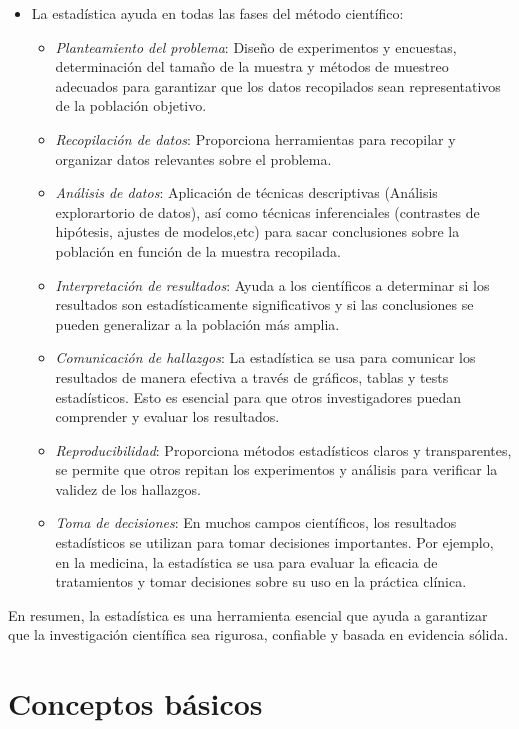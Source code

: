 \documentclass[
  spanish,
  letterpaper,
  DIV=11,
  numbers=noendperiod]{scrreprt}
\begin{document}
\begin{itemize}
\item
  La estadística ayuda en todas las fases del método científico:

  \begin{itemize}
  \item
    {\emph{Planteamiento del problema}}: Diseño de experimentos y
    encuestas, determinación del tamaño de la muestra y métodos de
    muestreo adecuados para garantizar que los datos recopilados sean
    representativos de la población objetivo.
  \item
    {\emph{Recopilación de datos}}: Proporciona herramientas para
    recopilar y organizar datos relevantes sobre el problema.
  \item
    {\emph{Análisis de datos}}: Aplicación de técnicas descriptivas
    (Análisis explorartorio de datos), así como técnicas inferenciales
    (contrastes de hipótesis, ajustes de modelos,etc) para sacar
    conclusiones sobre la población en función de la muestra recopilada.
  \item
    {\emph{Interpretación de resultados}}: Ayuda a los científicos a
    determinar si los resultados son estadísticamente significativos y
    si las conclusiones se pueden generalizar a la población más amplia.
  \item
    {\emph{Comunicación de hallazgos}}: La estadística se usa para
    comunicar los resultados de manera efectiva a través de gráficos,
    tablas y tests estadísticos. Esto es esencial para que otros
    investigadores puedan comprender y evaluar los resultados.
  \item
    {\emph{Reproducibilidad}}: Proporciona métodos estadísticos claros y
    transparentes, se permite que otros repitan los experimentos y
    análisis para verificar la validez de los hallazgos.
  \item
    {\emph{Toma de decisiones}}: En muchos campos científicos, los
    resultados estadísticos se utilizan para tomar decisiones
    importantes. Por ejemplo, en la medicina, la estadística se usa para
    evaluar la eficacia de tratamientos y tomar decisiones sobre su uso
    en la práctica clínica.
  \end{itemize}
\end{itemize}

En resumen, la estadística es una herramienta esencial que ayuda a
garantizar que la investigación científica sea rigurosa, confiable y
basada en evidencia sólida.

\section{Conceptos básicos}\label{conceptos-buxe1sicos}
\end{document}
